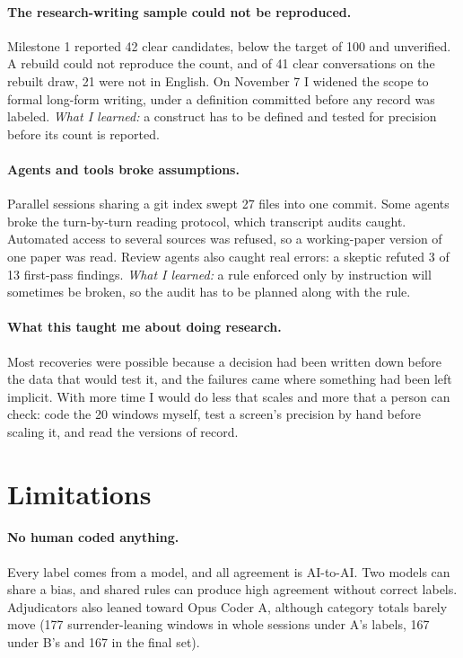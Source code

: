 \documentclass[manuscript,screen]{acmart}
\begin{document}
\paragraph{The research-writing sample could not be reproduced.} Milestone 1 reported 42 clear candidates, below the target of 100 and unverified. A rebuild could not reproduce the count, and of 41 clear conversations on the rebuilt draw, 21 were not in English. On November 7 I widened the scope to formal long-form writing, under a definition committed before any record was labeled. \emph{What I learned:} a construct has to be defined and tested for precision before its count is reported.

\paragraph{Agents and tools broke assumptions.} Parallel sessions sharing a git index swept 27 files into one commit. Some agents broke the turn-by-turn reading protocol, which transcript audits caught. Automated access to several sources was refused, so a working-paper version of one paper was read. Review agents also caught real errors: a skeptic refuted 3 of 13 first-pass findings. \emph{What I learned:} a rule enforced only by instruction will sometimes be broken, so the audit has to be planned along with the rule.

\paragraph{What this taught me about doing research.} Most recoveries were possible because a decision had been written down before the data that would test it, and the failures came where something had been left implicit. With more time I would do less that scales and more that a person can check: code the 20 windows myself, test a screen's precision by hand before scaling it, and read the versions of record.

\section{Limitations}
\label{sec:limitations}

\paragraph{No human coded anything.} Every label comes from a model, and all agreement is AI-to-AI. Two models can share a bias, and shared rules can produce high agreement without correct labels. Adjudicators also leaned toward Opus Coder A, although category totals barely move (177 surrender-leaning windows in whole sessions under A's labels, 167 under B's and 167 in the final set).
\end{document}
